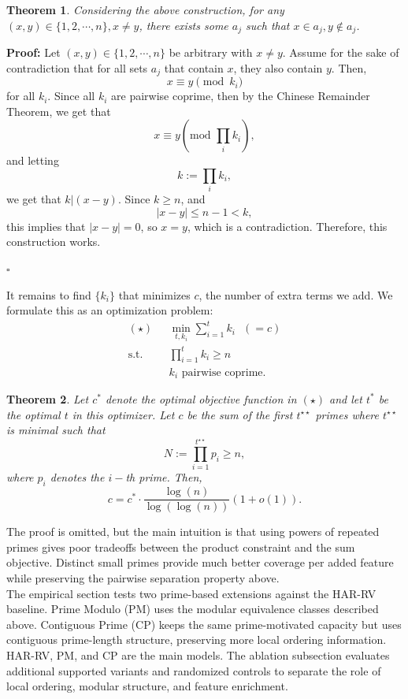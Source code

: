 \documentclass[11pt,a4paper]{article}
\newtheorem{theorem}{Theorem}
\begin{document}
\begin{theorem}
    Considering the above construction, for any $(x, y) \in \{1, 2, \cdots, n\}, x\neq y$, there exists some $a_j$ such that $x \in a_j, y \notin a_j$.
\end{theorem}
\noindent \textbf{Proof: }Let $(x, y) \in \{1, 2, \cdots, n\}$ be arbitrary with $x \neq y$. Assume for the sake of contradiction that for all sets $a_j$ that contain $x$, they also contain $y$. Then, $$x \equiv y \pmod{k_i}$$ for all $k_i$. Since all $k_i$ are pairwise coprime, then by the Chinese Remainder Theorem, we get that $$x \equiv y \left(\text{mod }\displaystyle\prod_i k_i\right),$$ and letting $$k := \displaystyle\prod_i k_i,$$we get that $k | (x-y)$. Since $k \geq n$, and $$|x-y| \leq n-1 < k,$$ this implies that $|x-y| = 0$, so $x=y$, which is a contradiction. Therefore, this construction works.
\begin{flushright}
  $\square$
\end{flushright}
\vspace{0.3cm}
\noindent It remains to find $\{k_i\}$ that minimizes $c$, the number of extra terms we add. We formulate this as an optimization problem:
\vspace{0.3cm}
\begin{align*}
    (\star) & \text{ } \min_{t, k_i} \displaystyle\sum_{i=1}^t k_i \text{ }(= c)
    \\ \text{s.t.} & \text{ }\prod_{i=1}^t k_i \geq n
    \\ &\text{ $k_i$ pairwise coprime}.
\end{align*}
\vspace{0.3cm}
\begin{theorem}
    Let $c^*$ denote the optimal objective function in $(\star)$ and let $t^*$ be the optimal $t$ in this optimizer. Let $c$ be the sum of the first $t^{\star\star}$ primes where $t^{\star\star}$ is minimal such that $$N := \displaystyle\prod_{i=1}^{t^{\star\star}} p_i \geq n,$$where $p_i$ denotes the $i-$th prime. Then, $$c = c^* \cdot \frac{\log(n)}{\log(\log(n))}(1+o(1)).$$
\end{theorem}
\vspace{0.3cm}
\noindent The proof is omitted, but the main intuition is that using powers of repeated primes gives poor tradeoffs between the product constraint and the sum objective. Distinct small primes provide much better coverage per added feature while preserving the pairwise separation property above.
\vspace{0.3cm}
\\ The empirical section tests two prime-based extensions against the HAR-RV baseline. Prime Modulo (PM) uses the modular equivalence classes described above. Contiguous Prime (CP) keeps the same prime-motivated capacity but uses contiguous prime-length structure, preserving more local ordering information. HAR-RV, PM, and CP are the main models. The ablation subsection evaluates additional supported variants and randomized controls to separate the role of local ordering, modular structure, and feature enrichment.
\end{document}

